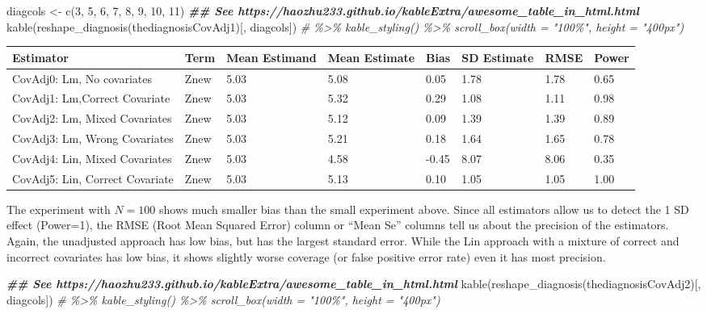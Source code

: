 \documentclass[
  12pt,
]{book}
\newenvironment{Shaded}{\begin{snugshade}}{\end{snugshade}}
\newcommand{\CommentTok}[1]{\textcolor[rgb]{0.56,0.35,0.01}{\textit{#1}}}
\newcommand{\DecValTok}[1]{\textcolor[rgb]{0.00,0.00,0.81}{#1}}
\newcommand{\DocumentationTok}[1]{\textcolor[rgb]{0.56,0.35,0.01}{\textbf{\textit{#1}}}}
\newcommand{\FunctionTok}[1]{\textcolor[rgb]{0.00,0.00,0.00}{#1}}
\newcommand{\NormalTok}[1]{#1}
\newcommand{\OtherTok}[1]{\textcolor[rgb]{0.56,0.35,0.01}{#1}}
\theoremstyle{definition}
\theoremstyle{definition}
\theoremstyle{definition}
\theoremstyle{remark}
\begin{document}
\begin{Shaded}
\begin{Highlighting}[]
\NormalTok{diagcols }\OtherTok{\textless{}{-}} \FunctionTok{c}\NormalTok{(}\DecValTok{3}\NormalTok{, }\DecValTok{5}\NormalTok{, }\DecValTok{6}\NormalTok{, }\DecValTok{7}\NormalTok{, }\DecValTok{8}\NormalTok{, }\DecValTok{9}\NormalTok{, }\DecValTok{10}\NormalTok{, }\DecValTok{11}\NormalTok{)}
\DocumentationTok{\#\# See https://haozhu233.github.io/kableExtra/awesome\_table\_in\_html.html}
\FunctionTok{kable}\NormalTok{(}\FunctionTok{reshape\_diagnosis}\NormalTok{(thediagnosisCovAdj1)[, diagcols]) }\CommentTok{\# \%\textgreater{}\% kable\_styling() \%\textgreater{}\% scroll\_box(width = "100\%", height = "400px")}
\end{Highlighting}
\end{Shaded}

\begin{tabular}{l|l|l|l|l|l|l|l}
\hline
Estimator & Term & Mean Estimand & Mean Estimate & Bias & SD Estimate & RMSE & Power\\
\hline
CovAdj0: Lm, No covariates & Znew & 5.03 & 5.08 & 0.05 & 1.78 & 1.78 & 0.65\\
\hline
CovAdj1: Lm,Correct Covariate & Znew & 5.03 & 5.32 & 0.29 & 1.08 & 1.11 & 0.98\\
\hline
CovAdj2: Lm,  Mixed Covariates & Znew & 5.03 & 5.12 & 0.09 & 1.39 & 1.39 & 0.89\\
\hline
CovAdj3: Lm, Wrong Covariates & Znew & 5.03 & 5.21 & 0.18 & 1.64 & 1.65 & 0.78\\
\hline
CovAdj4: Lin, Mixed Covariates & Znew & 5.03 & 4.58 & -0.45 & 8.07 & 8.06 & 0.35\\
\hline
CovAdj5: Lin, Correct Covariate & Znew & 5.03 & 5.13 & 0.10 & 1.05 & 1.05 & 1.00\\
\hline
\end{tabular}

The experiment with \(N=100\) shows much smaller bias than the small
experiment above. Since all estimators allow us to detect the 1 SD
effect (Power=1), the RMSE (Root Mean Squared Error) column or ``Mean
Se'' columns tell us about the precision of the estimators. Again, the
unadjusted approach has low bias, but has the largest standard error.
While the Lin approach with a mixture of correct and incorrect
covariates has low bias, it shows slightly worse coverage (or false
positive error rate) even it has most precision.

\begin{Shaded}
\begin{Highlighting}[]
\DocumentationTok{\#\# See https://haozhu233.github.io/kableExtra/awesome\_table\_in\_html.html}
\FunctionTok{kable}\NormalTok{(}\FunctionTok{reshape\_diagnosis}\NormalTok{(thediagnosisCovAdj2)[, diagcols]) }\CommentTok{\# \%\textgreater{}\% kable\_styling() \%\textgreater{}\% scroll\_box(width = "100\%", height = "400px")}
\end{Highlighting}
\end{Shaded}
\end{document}
